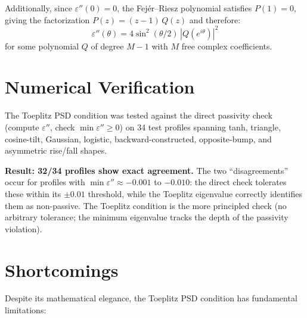 \documentclass[11pt]{article}
\newcommand{\eps}{\varepsilon}
\begin{document}
Additionally, since $\eps''(0) = 0$, the Fej\'er--Riesz polynomial satisfies $P(1) = 0$, giving the factorization $P(z) = (z-1)\,Q(z)$ and therefore:
\begin{equation}
\eps''(\theta) = 4\sin^2(\theta/2)\,|Q(e^{i\theta})|^2
\end{equation}
for some polynomial $Q$ of degree $M-1$ with $M$ free complex coefficients.

\section{Numerical Verification}

The Toeplitz PSD condition was tested against the direct passivity check (compute $\eps''$, check $\min \eps'' \geq 0$) on 34 test profiles spanning tanh, triangle, cosine-tilt, Gaussian, logistic, backward-constructed, opposite-bump, and asymmetric rise/fall shapes.

\textbf{Result: 32/34 profiles show exact agreement.}  The two ``disagreements'' occur for profiles with $\min \eps'' \approx -0.001$ to $-0.010$: the direct check tolerates these within its $\pm 0.01$ threshold, while the Toeplitz eigenvalue correctly identifies them as non-passive.  The Toeplitz condition is the more principled check (no arbitrary tolerance; the minimum eigenvalue tracks the depth of the passivity violation).

\section{Shortcomings}

Despite its mathematical elegance, the Toeplitz PSD condition has fundamental limitations:
\end{document}
